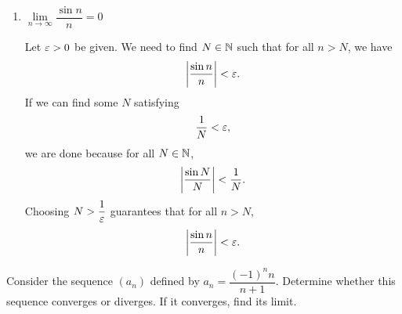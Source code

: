 \begin{problem}
\begin{enumerate}[label=(\alph*)]
    \item $\lim\limits_{n \to \infty} \dfrac{\sin n}{n} = 0$

      Let $\varepsilon > 0$ be given. We need to find $N \in \mathbb{N}$ such that for all $n > N$, we have 
      \[
        \left\lvert \frac{\sin n}{n} \right\rvert < \varepsilon.
      \]
      If we can find some $N$ satisfying
      \[
        \frac{1}{N} < \varepsilon,
      \]
      we are done because for all $N \in \mathbb{N}$,
      \[
        \left\lvert \frac{\sin N}{N} \right\rvert < \dfrac{1}{N}.
      \]
      Choosing $N > \dfrac{1}{\varepsilon}$ guarantees that for all $n > N$,
      \[
        \left\lvert \frac{\sin n}{n} \right\rvert < \varepsilon.
      \]

  \end{enumerate}

\end{problem}

\begin{problem}
  Consider the sequence $(a_{n})$ defined by $a_{n} = \dfrac{(-1)^{n} n}{n + 1}$.
  Determine whether this sequence converges or diverges. If it converges, find
  its limit.
\end{problem}
